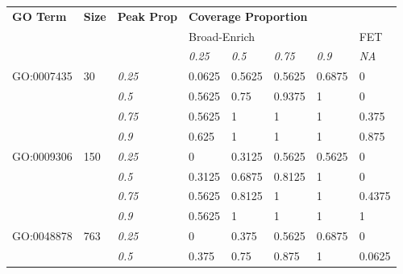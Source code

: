 \begin{table}[!ht]
\small
\centering
\begin{tabular}{ll|l|llll|l}
\textbf{GO Term}            & \textbf{Size}        & \textbf{Peak Prop} & \multicolumn{5}{l}{\textbf{Coverage Proportion}}                          \\
                            &                      &                    & \multicolumn{4}{l}{Broad-Enrich}                            & FET         \\
                            &                      &                    & \textit{0.25} & \textit{0.5} & \textit{0.75} & \textit{0.9} & \textit{NA} \\\hline
\multirow{4}{*}{GO:0007435} & \multirow{4}{*}{30}  & \textit{0.25}      & 0.0625        & 0.5625       & 0.5625        & 0.6875       & 0           \\
                            &                      & \textit{0.5}       & 0.5625        & 0.75         & 0.9375        & 1            & 0           \\
                            &                      & \textit{0.75}      & 0.5625        & 1            & 1             & 1            & 0.375       \\
                            &                      & \textit{0.9}       & 0.625         & 1            & 1             & 1            & 0.875       \\\hline
\multirow{4}{*}{GO:0009306} & \multirow{4}{*}{150} & \textit{0.25}      & 0             & 0.3125       & 0.5625        & 0.5625       & 0           \\
                            &                      & \textit{0.5}       & 0.3125        & 0.6875       & 0.8125        & 1            & 0           \\
                            &                      & \textit{0.75}      & 0.5625        & 0.8125       & 1             & 1            & 0.4375      \\
                            &                      & \textit{0.9}       & 0.5625        & 1            & 1             & 1            & 1           \\\hline
\multirow{4}{*}{GO:0048878} & \multirow{4}{*}{763} & \textit{0.25}      & 0             & 0.375        & 0.5625        & 0.6875       & 0           \\
                            &                      & \textit{0.5}       & 0.375         & 0.75         & 0.875         & 1            & 0.0625      \\

\end{tabular}
\end{table}
